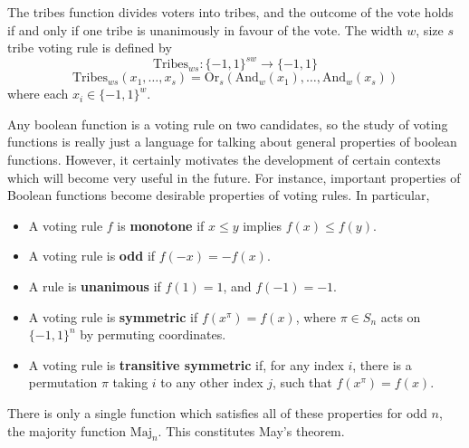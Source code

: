 \begin{example}
    The tribes function divides voters into tribes, and the outcome of the vote holds if and only if one tribe is unanimously in favour of the vote. The width $w$, size $s$ tribe voting rule is defined by
    \[ \text{Tribes}_{ws}: \{ -1, 1 \}^{sw} \to \{ -1, 1 \} \]
    \[ \text{Tribes}_{ws}(x_1, \dots, x_s) = \text{Or}_s(\text{And}_w(x_1), \dots, \text{And}_w(x_s)) \]
    where each $x_i \in \{ -1, 1 \}^w$.
\end{example}

Any boolean function is a voting rule on two candidates, so the study of voting functions is really just a language for talking about general properties of boolean functions. However, it certainly motivates the development of certain contexts which will become very useful in the future. For instance, important properties of Boolean functions become desirable properties of voting rules. In particular,
%
\begin{itemize}
    \item A voting rule $f$ is {\bf monotone} if $x \leq y$ implies $f(x) \leq f(y)$.
    \item A voting rule is {\bf odd} if $f(-x) = -f(x)$.
    \item A rule is {\bf unanimous} if $f(1) = 1$, and $f(-1) = -1$.
    \item A voting rule is {\bf symmetric} if $f(x^\pi) = f(x)$, where $\pi \in S_n$ acts on $\{ -1, 1 \}^n$ by permuting coordinates.
    \item A voting rule is {\bf transitive symmetric} if, for any index $i$, there is a permutation $\pi$ taking $i$ to any other index $j$, such that $f(x^\pi) = f(x)$.
\end{itemize}
%
There is only a single function which satisfies all of these properties for odd $n$, the majority function $\text{Maj}_n$. This constitutes May's theorem.

